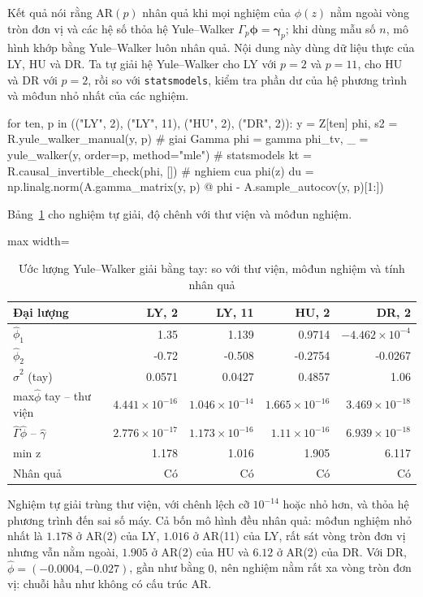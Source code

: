  Kết quả  nói rằng AR$(p)$ nhân quả khi mọi nghiệm của $\phi(z)$ nằm ngoài vòng tròn đơn vị và các hệ số thỏa hệ Yule--Walker $\Gamma_p\boldsymbol\phi=\boldsymbol\gamma_p$; khi dùng mẫu số $n$, mô hình khớp bằng Yule--Walker luôn nhân quả.
 Nội dung này dùng dữ liệu thực của LY, HU và DR. Ta tự giải hệ Yule--Walker cho LY với $p=2$ và $p=11$, cho HU và DR với $p=2$, rồi so với \texttt{statsmodels}, kiểm tra phần dư của hệ phương trình và môđun nhỏ nhất của các nghiệm.
\begin{codeblock}
for ten, p in (("LY", 2), ("LY", 11), ("HU", 2), ("DR", 2)):
    y = Z[ten]
    phi, s2 = R.yule_walker_manual(y, p)                    # giai Gamma phi = gamma
    phi_tv, _ = yule_walker(y, order=p, method="mle")       # statsmodels
    kt = R.causal_invertible_check(phi, [])                 # nghiem cua phi(z)
    du = np.linalg.norm(A.gamma_matrix(y, p) @ phi - A.sample_autocov(y, p)[1:])
\end{codeblock}
 Bảng~\ref{tab:tab_b11_07_yule_walker} cho nghiệm tự giải, độ chênh với thư viện và môđun nghiệm.
\begin{table}[H]
\centering\footnotesize
\caption{Ước lượng Yule–Walker giải bằng tay: so với thư viện, môđun nghiệm và tính nhân quả}\label{tab:tab_b11_07_yule_walker}
\begin{adjustbox}{max width=\linewidth}
\begin{tabular}{|l|r|r|r|r|}
\toprule
Đại lượng & LY, 2 & LY, 11 & HU, 2 & DR, 2 \\
\midrule
$\hat{\phi}_{1}$ & 1.35 & 1.139 & 0.9714 & $-4.462\times10^{-4}$ \\
$\hat{\phi}_{2}$ & -0.72 & -0.508 & -0.2754 & -0.0267 \\
$\hat{\sigma}^{2}$ (tay) & 0.0571 & 0.0427 & 0.4857 & 1.06 \\
max\textbar{}$\hat{\phi}$ tay – thư viện\textbar{} & $4.441\times10^{-16}$ & $1.046\times10^{-14}$ & $1.665\times10^{-16}$ & $3.469\times10^{-18}$ \\
\textbar{}$\hat{\Gamma}\hat{\phi}$ – $\hat{\gamma}$\textbar{} & $2.776\times10^{-17}$ & $1.173\times10^{-16}$ & $1.11\times10^{-16}$ & $6.939\times10^{-18}$ \\
min \textbar{}z\textbar{} & 1.178 & 1.016 & 1.905 & 6.117 \\
Nhân quả & Có & Có & Có & Có \\
\bottomrule
\end{tabular}
\end{adjustbox}
\end{table}
 Nghiệm tự giải trùng thư viện, với chênh lệch cỡ $10^{-14}$ hoặc nhỏ hơn, và thỏa hệ phương trình đến sai số máy. Cả bốn mô hình đều nhân quả: môđun nghiệm nhỏ nhất là $1.178$ ở AR(2) của LY, $1.016$ ở AR(11) của LY, rất sát vòng tròn đơn vị nhưng vẫn nằm ngoài, $1.905$ ở AR(2) của HU và $6.12$ ở AR(2) của DR. Với DR, $\hat\phi=(-0.0004,-0.027)$, gần như bằng $0$, nên nghiệm nằm rất xa vòng tròn đơn vị: chuỗi hầu như không có cấu trúc AR.

